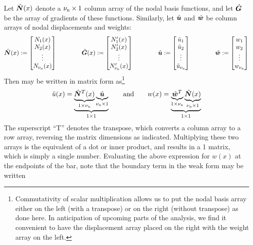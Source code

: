 \renewcommand{\gradNBFa}{\Array{G}}
Let $\hat{\bm{N}}(x)$ denote a 
${\nu_\text{n}}\times1$ column array of the nodal basis functions, and let $\gradNBFa$ be the array of gradients of these functions. Similarly, 
let $\hat{\bm{u}}$ and $\hat{\bm{w}}$ be \numnodes{} column arrays of nodal displacements and weights:
\begin{equation}
  \NBFa(x)\definedEqual\begin{bmatrix}\NBF_1(x)\\ \NBF_2(x) \\ \vdots \\ \NBF_\numnodes(x)\end{bmatrix}
\qquad\qquad
  \gradNBFa(x)\definedEqual\begin{bmatrix}\NBF_1'(x)\\ \NBF_2'(x) \\ \vdots \\ \NBF_\numnodes'(x)\end{bmatrix}
\qquad\qquad
  \Array{u}\definedEqual\begin{bmatrix} \aprx{u}_1\\ \aprx{u}_2 \\ \vdots \\ \aprx{u}_\numnodes\end{bmatrix}
\qquad\qquad
  \Array{w}\definedEqual\begin{bmatrix}w_1\\ w_2 \\ \vdots \\ w_\numnodes\end{bmatrix}
\end{equation}
Then  may be written in matrix form as\footnote{Commutativity of scalar multiplication allows us to put the nodal basis array either on the left (with a transpose) or on the right (without transpose) as done here. In anticipation of upcoming parts of the analysis, we find it convenient to have the displacement array placed on the right with the weight array on the left.}
\begin{equation}
\tilde{u}(x)=\underbrace{
\underbrace{\hat{\bm{N}}^T(x)}_{1\times{\nu_\text{n}}} \underbrace{\hat{\bm{u}}}_{{\nu_\text{n}}\times1}}_{1\times1}
\qquad\text{and}\qquad
 w(x)=\underbrace{\underbrace{\hat{\bm{w}}^T}_{1\times{\nu_\text{n}}}\underbrace{\hat{\bm{N}}(x)}_{{\nu_\text{n}}\times1}}_{1\times1}
\label{eq:uandwstatic}
\end{equation}
The superscript ``T'' denotes the transpose, which converts a column array to a row array, reversing the matrix dimensions as indicated.  Multiplying these two arrays is the equivalent of a dot or inner product, and results in a 1 matrix, which is simply a single number.  Evaluating the above expression for $w(x)$ at the endpoints of the bar, note that the boundary term in the weak form may be written
